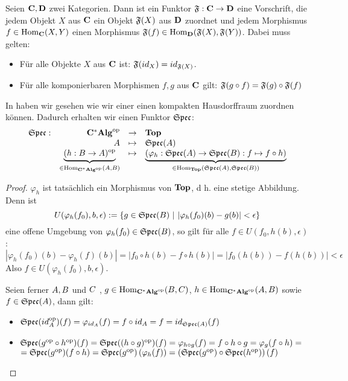 \begin{defn}[Funktor]
Seien $\mathbf{C}, \mathbf{D}$ zwei Kategorien. Dann ist ein Funktor $\mathfrak{F}: \mathbf{C} \to \mathbf{D}$ eine Vorschrift, die jedem Objekt $X$ aus $\mathbf{C}$ ein Objekt $\mathfrak{F}(X)$ aus $\mathbf{D}$ zuordnet und jedem Morphismus $f \in \mathrm{Hom}_{\mathbf{C}}(X,Y)$ einen Morphismus $\mathfrak{F}(f) \in \mathrm{Hom}_{\mathbf{D}}(\mathfrak{F}(X), \mathfrak{F}(Y))$. Dabei muss gelten:
\begin{itemize}
	\item Für alle Objekte $X$ aus $\mathbf{C}$ ist: $\mathfrak{F}(id_X) = id_{\mathfrak{F}(X)}$.
	\item Für alle komponierbaren Morphismen $f, g$ aus $\mathbf{C}$ gilt: $\mathfrak{F}(g\circ f) = \mathfrak{F}(g)\circ \mathfrak{F}(f)$
\end{itemize}
\end{defn}

\begin{bsp}\label{bsp:FunktorSpec}
In  haben wir gesehen wie wir einer \CAlg{} einen kompakten Hausdorffraum zuordnen können. Dadurch erhalten wir einen Funktor $\mathfrak{Spec}$:
\[ \begin{array}{@{}rrcl@{}}
	\SpecC: 	&\KatCAlg^\op		&\to 		&\KatTop													\\
				&\A					&\mapsto 	&\SpecC(\A)													\\				
				&\underbrace{(h:\B \to \A)^\op}_{\in \Hom_{\KatCAlg^\op}(\A,\B)} 	&\mapsto	
				&\underbrace{(\varphi_h: \SpecC(\A) \to \SpecC(\B): f \mapsto f \circ h)}_{\in \Hom_{\KatTop}(\SpecC(\A),\SpecC(\B))}
\end{array} \]
\end{bsp}

\begin{proof}$\varphi_h$ ist tatsächlich ein Morphismus von $\mathbf{Top}$, d h. eine stetige Abbildung. Denn ist 
	\[U(\varphi_h(f_0), b, \epsilon) := \{g \in \mathfrak{Spec}(B) ~|~ |\varphi_h(f_0)(b)-g(b)| < \epsilon\}\]
eine offene Umgebung von $\varphi_h(f_0) \in \mathfrak{Spec}(B)$, so gilt für alle $f \in U(f_0,h(b),\epsilon)$:
	\[\left|\varphi_h(f_0)(b)-\varphi_h(f)(b)\right| = \left|f_0\circ h(b) - f\circ h(b)\right| = \left|f_0(h(b))-f(h(b))\right| < \epsilon\]
Also $f \in U(\varphi_h(f_0), b, \epsilon)$.

Seien ferner $A, B$ und $C$ \CAlgn{}, $g \in \mathrm{Hom}_{\mathbf{C^*Alg}^{\mathrm{op}}}(B,C)$, $h \in \mathrm{Hom}_{\mathbf{C^*Alg}^{\mathrm{op}}}(A,B)$ sowie $f \in \mathfrak{Spec}(A)$, dann gilt:
\begin{itemize}
	\item $\mathfrak{Spec}(id_A^{\mathrm{op}})(f) = \varphi_{id_A}(f) = f \circ id_A = f =  id_{\mathfrak{Spec}(A)}(f)$
	\item $\mathfrak{Spec}(g^{\mathrm{op}} \circ h^{\mathrm{op}})(f) = \mathfrak{Spec}((h \circ g)^{\mathrm{op}})(f) = \varphi_{h \circ g}(f) = f \circ h \circ g = \varphi_g(f \circ h) =$ \newline $ = \mathfrak{Spec}(g^{\mathrm{op}})(f \circ h) = \mathfrak{Spec}(g^{\mathrm{op}})\left(\varphi_h(f)\right) = \left(\mathfrak{Spec}(g^{\mathrm{op}})\circ\mathfrak{Spec}(h^{\mathrm{op}})\right)(f)$
\end{itemize}
\end{proof}

